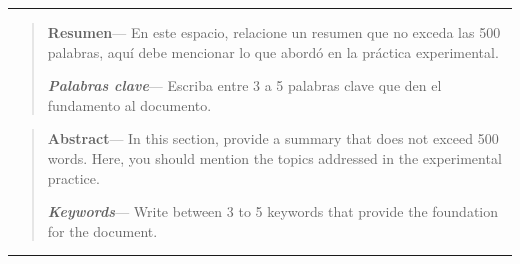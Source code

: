 \noindent\rule{\linewidth}{1.0pt}

\begin{quote}
    \noindent \textbf{Resumen}--- En este espacio, relacione un resumen que no exceda las 500 palabras, aquí debe mencionar lo que abordó en la práctica experimental.
        
    \noindent \textbf{\textit{Palabras clave}}--- Escriba entre 3 a 5 palabras clave que den el fundamento al documento.
\end{quote}


\begin{quote}
    \noindent \textbf{Abstract}--- In this section, provide a summary that does not exceed 500 words.
Here, you should mention the topics addressed in the experimental practice.
    
    \noindent \textbf{\textit{Keywords}}--- Write between 3 to 5 keywords that provide the foundation for the
document.
\end{quote}

\noindent\rule{\linewidth}{1.0pt}
